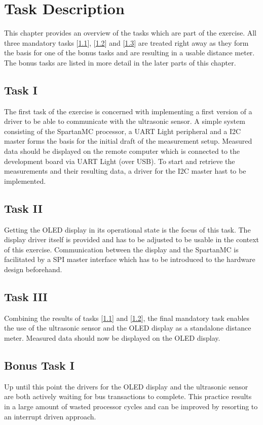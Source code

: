 \chapter{Task Description}
\label{cha:task}
	This chapter provides an overview of the tasks which are part of the exercise. All three mandatory tasks [\ref{sec:task_1}], [\ref{sec:task_2}] and [\ref{sec:task_3}] are treated right away as they form the basis for one of the bonus tasks and are resulting in a usable distance meter.
	The bonus tasks are listed in more detail in the later parts of this chapter.

	\section{Task I} %
	\label{sec:task_1}
		The first task of the exercise is concerned with implementing a first version of a driver to be able to communicate with the ultrasonic sensor. A simple system consisting of the SpartanMC processor, a UART Light peripheral and a I2C master forms the basis for the initial draft of the measurement setup.
		Measured data should be displayed on the remote computer which is connected to the development board via UART Light (over USB). To start and retrieve the measurements and their resulting data, a driver for the I2C master hast to be implemented.

	\section{Task II} %
	\label{sec:task_2}
		Getting the OLED display in its operational state is the focus of this task. The display driver itself is provided and has to be adjusted to be usable in the context of this exercise.
		Communication between the display and the SpartanMC is facilitated by a SPI master interface which has to be introduced to the hardware design beforehand.

	\section{Task III} %
	\label{sec:task_3}
		Combining the results of tasks [\ref{sec:task_1}] and [\ref{sec:task_2}], the final mandatory task enables the use of the ultrasonic sensor and the OLED display as a standalone distance meter. Measured data should now be displayed on the OLED display.

	\section{Bonus Task I} %
	\label{sec:bonus_task_1}
		Up until this point the drivers for the OLED display and the ultrasonic sensor are both actively waiting for bus transactions to complete. This practice results in a large amount of wasted processor cycles and can be improved by resorting to an interrupt driven approach. 

